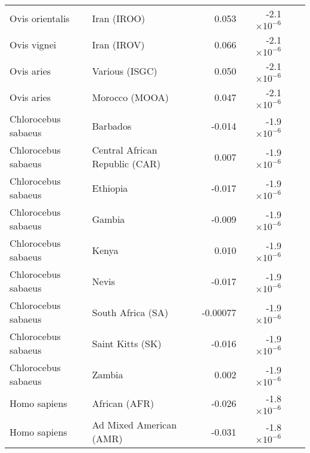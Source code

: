 \documentclass{article}
\begin{document}
\begin{table*}[!ht]
\begin{adjustbox}{width = 1\textwidth}
\begin{tabular}{|l|l|r|r|r|r|}
                Ovis orientalis     & Iran (IROO)                    & 0.053                 & -2.1$\times 10^{-6}$                 \\
                Ovis vignei         & Iran (IROV)                    & 0.066                 & -2.1$\times 10^{-6}$                 \\
                Ovis aries          & Various (ISGC)                 & 0.050                 & -2.1$\times 10^{-6}$                 \\
                Ovis aries          & Morocco (MOOA)                 & 0.047                 & -2.1$\times 10^{-6}$                 \\
                Chlorocebus sabaeus & Barbados                       & -0.014                & -1.9$\times 10^{-6}$                 \\
                Chlorocebus sabaeus & Central African Republic (CAR) & 0.007                 & -1.9$\times 10^{-6}$                 \\
                Chlorocebus sabaeus & Ethiopia                       & -0.017                & -1.9$\times 10^{-6}$                 \\
                Chlorocebus sabaeus & Gambia                         & -0.009                & -1.9$\times 10^{-6}$                 \\
                Chlorocebus sabaeus & Kenya                          & 0.010                 & -1.9$\times 10^{-6}$                 \\
                Chlorocebus sabaeus & Nevis                          & -0.017                & -1.9$\times 10^{-6}$                 \\
                Chlorocebus sabaeus & South Africa (SA)              & -0.00077              & -1.9$\times 10^{-6}$                 \\
                Chlorocebus sabaeus & Saint Kitts (SK)               & -0.016                & -1.9$\times 10^{-6}$                 \\
                Chlorocebus sabaeus & Zambia                         & 0.002                 & -1.9$\times 10^{-6}$                 \\
                Homo sapiens        & African (AFR)                  & -0.026                & -1.8$\times 10^{-6}$                 \\
                Homo sapiens        & Ad Mixed American (AMR)        & -0.031                & -1.8$\times 10^{-6}$                 \\

\end{tabular}
\end{adjustbox}
\end{table*}
\end{document}
